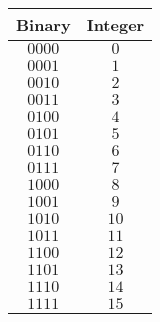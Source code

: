 \begin{tabular}{cc} \toprule
Binary & Integer \\\midrule
$0000$ & $0$     \\
$0001$ & $1$     \\
$0010$ & $2$     \\
$0011$ & $3$     \\
$0100$ & $4$     \\
$0101$ & $5$     \\
$0110$ & $6$     \\
$0111$ & $7$     \\
$1000$ & $8$     \\
$1001$ & $9$     \\
$1010$ & $10$    \\
$1011$ & $11$    \\
$1100$ & $12$    \\
$1101$ & $13$    \\
$1110$ & $14$    \\
$1111$ & $15$    \\\bottomrule
\end{tabular}
